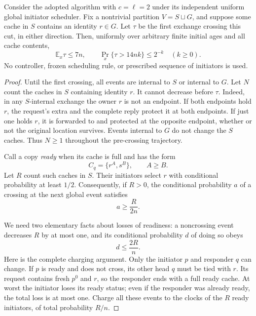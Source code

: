 \begin{theorem}
\label{thm:c2readycontact}
Consider the adopted algorithm with $c=\ell=2$ under its
independent uniform global initiator scheduler. Fix a
nontrivial partition $V=S\sqcup G$, and suppose some
cache in $S$ contains an identity $r\in G$.
Let $\tau$ be the first exchange crossing this cut,
in either direction. Then, uniformly over arbitrary
finite initial ages and all cache contents,
\[
 \mathbb E_x\tau\le7n,\qquad
 \Pr_x\{\tau>14nk\}\le2^{-k}\quad(k\ge0).
\]
No controller, frozen scheduling rule, or prescribed
sequence of initiators is used.
\end{theorem}

\begin{proof}
Until the first crossing, all events are internal to
$S$ or internal to $G$. Let $N$ count the caches in
$S$ containing identity $r$. It cannot decrease before
$\tau$. Indeed, in any $S$-internal exchange the owner
$r$ is not an endpoint. If both endpoints hold $r$,
the request's extra and the complete reply protect it
at both endpoints. If just one holds $r$, it is
forwarded to and protected at the opposite endpoint,
whether or not the original location survives.
Events internal to $G$ do not change the $S$ caches.
Thus $N\ge1$ throughout the pre-crossing trajectory.

Call a copy \emph{ready} when its cache is full and
has the form
\[
 C_q=\{r^A,s^B\},\qquad A\ge B.
\]
Let $R$ count such caches in $S$. Their initiators
select $r$ with conditional probability at least
$1/2$. Consequently, if $R>0$, the conditional
probability $a$ of a crossing at the next global
event satisfies
\[
 a\ge\frac{R}{2n}.
\]

We need two elementary facts about losses of readiness:
a noncrossing event decreases $R$ by at most one,
and its conditional probability $d$ of doing so obeys
\[
 d\le\frac{2R}{n}.
\]
Here is the complete charging argument. Only the
initiator $p$ and responder $q$ can change.
If $p$ is ready and does not cross, its other head
$q$ must be tied with $r$. Its request contains
fresh $p^0$ and $r$, so the responder ends with
a full ready cache. At worst the initiator loses
its ready status; even if the responder was already
ready, the total loss is at most one.
Charge all these events to the clocks of the
$R$ ready initiators, of total probability $R/n$.


\end{proof}

